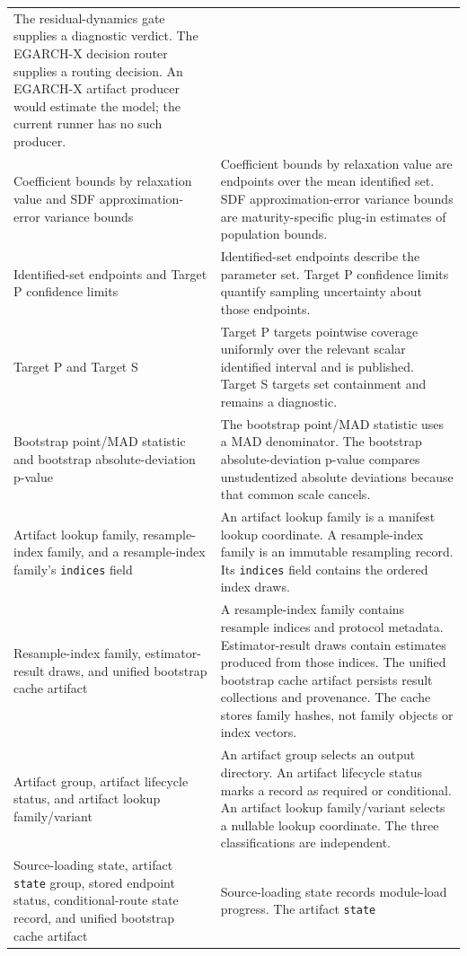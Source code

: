 \documentclass[11pt]{article}
\DeclareRobustCommand{\code}[1]{%
  \ifmmode\text{\ttfamily\detokenize{#1}}\else\nolinkurl{#1}\fi}
\newcommand{\TauP}{\textnormal{Target P}}
\newcommand{\TauS}{\textnormal{Target S}}
\begin{document}
\begin{longtable}{@{}>{\raggedright\arraybackslash}p{}
  >{\raggedright\arraybackslash}p{}@{}}
The residual-dynamics gate supplies a diagnostic verdict. The EGARCH-X decision
router supplies a routing decision. An EGARCH-X artifact producer would estimate
the model; the current runner has no such producer.\\
Coefficient bounds by relaxation value and SDF approximation-error variance
bounds & Coefficient bounds by relaxation value are endpoints over the mean
identified set. SDF approximation-error variance bounds are maturity-specific
plug-in estimates of population bounds.\\
Identified-set endpoints and \TauP{} confidence limits & Identified-set endpoints
describe the parameter set. Target P confidence limits quantify sampling
uncertainty about those endpoints.\\
\TauP{} and \TauS{} & \TauP{} targets pointwise coverage uniformly over the
relevant scalar identified interval and is published. \TauS{} targets set
containment and remains a diagnostic.\\
Bootstrap point/MAD statistic and bootstrap absolute-deviation p-value & The
bootstrap point/MAD statistic uses a MAD denominator. The bootstrap
absolute-deviation p-value compares unstudentized absolute deviations because
that common scale cancels.\\
Artifact lookup family, resample-index family, and a resample-index family's
\code{indices} field & An artifact lookup family is a manifest lookup coordinate.
A resample-index family is an immutable resampling record. Its \code{indices}
field contains the ordered index draws.\\
Resample-index family, estimator-result draws, and unified bootstrap cache
artifact & A resample-index family contains resample indices and protocol
metadata. Estimator-result draws contain estimates produced from those indices.
The unified bootstrap cache artifact persists result collections and provenance.
The cache stores family hashes, not family
objects or index vectors.\\
Artifact group, artifact lifecycle status, and artifact lookup family/variant &
An artifact group selects an output directory. An artifact lifecycle status
marks a record as required or conditional. An artifact lookup family/variant
selects a nullable lookup coordinate. The three classifications are
independent.\\
Source-loading state, artifact \code{state} group, stored endpoint status,
conditional-route state record, and unified bootstrap cache artifact &
Source-loading state records module-load progress. The artifact \code{state}

\end{longtable}
\end{document}

